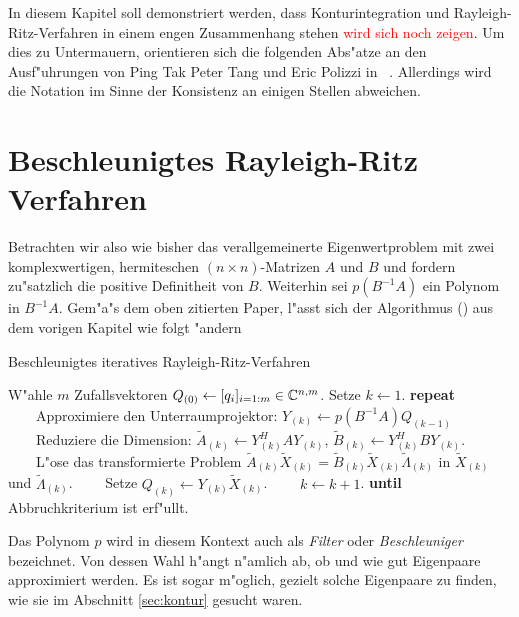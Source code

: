 In diesem Kapitel soll demonstriert werden, dass Konturintegration und
Rayleigh-Ritz-Verfahren in einem engen Zusammenhang stehen \textcolor{red}{wird sich noch zeigen}.
Um dies zu Untermauern, orientieren sich die folgenden Abs"atze an den Ausf"uhrungen
von Ping Tak Peter Tang und Eric Polizzi in ~\cite{ptep}. Allerdings wird
die Notation im Sinne der Konsistenz an einigen Stellen abweichen.

\section{Beschleunigtes Rayleigh-Ritz Verfahren}

Betrachten wir also wie bisher das verallgemeinerte Eigenwertproblem mit zwei
komplexwertigen, hermiteschen $(n\times n)$-Matrizen $A$ und $B$ und fordern
zu"satzlich die positive Definitheit von $B$. Weiterhin sei $p(B^{-1}A)$ ein
Polynom in $B^{-1}A$. Gem"a"s dem oben zitierten Paper, l"asst sich der Algorithmus
() aus dem vorigen Kapitel wie folgt "andern

\begin{algorithm}\label{alg:beschlrr}
\caption{Beschleunigtes iteratives Rayleigh-Ritz-Verfahren}\label{euclid}
\begin{algorithmic}[1]
\State W"ahle $m$ Zufallsvektoren $Q_{(0)} \gets [q_i]_{i=1:m} \in\mathbb{C}^{n,m}$.
Setze $k \gets 1$.
\State \textbf{repeat}
\State \ \ \ \ Approximiere den Unterraumprojektor: $Y_{(k)} \gets p(B^{-1}A)Q_{(k-1)}$
\State \ \ \ \ Reduziere die Dimension: $\widetilde{A}_{(k)} \gets Y_{(k)}^H A Y_{(k)}$,
$\widetilde{B}_{(k)} \gets Y_{(k)}^H B Y_{(k)}$.
\State \ \ \ \ L"ose das transformierte Problem $\widetilde{A}_{(k)}\widetilde{X}_{(k)}
= \widetilde{B}_{(k)}\widetilde{X}_{(k)}\widetilde{\Lambda}_{(k)}$ in
$\widetilde{X}_{(k)}$ und $\widetilde{\Lambda}_{(k)}$.
\State \ \ \ \ Setze $Q_{(k)} \gets Y_{(k)}\widetilde{X}_{(k)}$.
\State \ \ \ \ $k \gets k+1$.
\State \textbf{until} Abbruchkriterium ist erf"ullt.
\end{algorithmic}
\end{algorithm}

Das Polynom $p$ wird in diesem Kontext auch als \emph{Filter} oder \emph{Beschleuniger}
bezeichnet. Von dessen Wahl h"angt n"amlich ab, ob und wie gut Eigenpaare approximiert
werden. Es ist sogar m"oglich, gezielt solche Eigenpaare zu finden, wie sie im
Abschnitt \ref{sec:kontur} gesucht waren.\\

